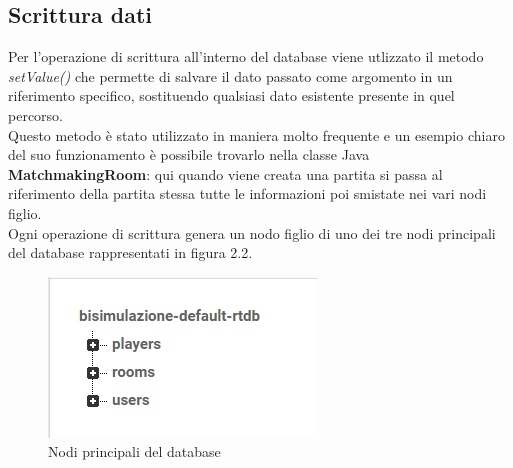 \documentclass[a4paper,11pt,twoside,openright]{report}
\begin{document}
\subsection{Scrittura dati}
Per l'operazione di scrittura all'interno del database viene utlizzato il metodo \textit{setValue()}\cite{8} che permette di salvare il dato passato come argomento in un riferimento specifico, sostituendo qualsiasi dato esistente presente in quel percorso.\\
Questo metodo è stato utilizzato in maniera molto frequente e un esempio chiaro del suo funzionamento è possibile trovarlo nella classe Java \textbf{MatchmakingRoom}: qui quando viene creata una partita si passa al riferimento della partita stessa tutte le informazioni poi smistate nei vari nodi figlio.\\
Ogni operazione di scrittura genera un nodo figlio di uno dei tre nodi principali del database rappresentati in figura 2.2.

\begin{figure}[h]
\includegraphics{images/Main nodes.png}
\caption{Nodi principali del database}
\end{figure}
\end{document}
